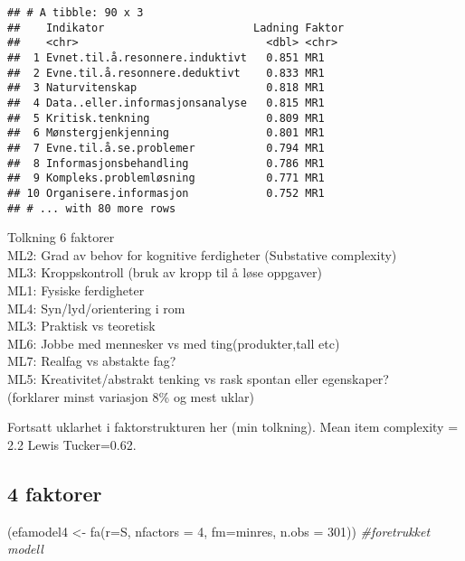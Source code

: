 \documentclass[
]{article}
\newenvironment{Shaded}{\begin{snugshade}}{\end{snugshade}}
\newcommand{\AttributeTok}[1]{\textcolor[rgb]{0.77,0.63,0.00}{#1}}
\newcommand{\CommentTok}[1]{\textcolor[rgb]{0.56,0.35,0.01}{\textit{#1}}}
\newcommand{\DecValTok}[1]{\textcolor[rgb]{0.00,0.00,0.81}{#1}}
\newcommand{\FunctionTok}[1]{\textcolor[rgb]{0.00,0.00,0.00}{#1}}
\newcommand{\NormalTok}[1]{#1}
\newcommand{\OtherTok}[1]{\textcolor[rgb]{0.56,0.35,0.01}{#1}}
\newcommand{\StringTok}[1]{\textcolor[rgb]{0.31,0.60,0.02}{#1}}
\begin{document}
\begin{verbatim}
## # A tibble: 90 x 3
##    Indikator                       Ladning Faktor
##    <chr>                             <dbl> <chr> 
##  1 Evnet.til.å.resonnere.induktivt   0.851 MR1   
##  2 Evne.til.å.resonnere.deduktivt    0.833 MR1   
##  3 Naturvitenskap                    0.818 MR1   
##  4 Data..eller.informasjonsanalyse   0.815 MR1   
##  5 Kritisk.tenkning                  0.809 MR1   
##  6 Mønstergjenkjenning               0.801 MR1   
##  7 Evne.til.å.se.problemer           0.794 MR1   
##  8 Informasjonsbehandling            0.786 MR1   
##  9 Kompleks.problemløsning           0.771 MR1   
## 10 Organisere.informasjon            0.752 MR1   
## # ... with 80 more rows
\end{verbatim}

Tolkning 6 faktorer\\
ML2: Grad av behov for kognitive ferdigheter (Substative complexity)\\
ML3: Kroppskontroll (bruk av kropp til å løse oppgaver)\\
ML1: Fysiske ferdigheter\\
ML4: Syn/lyd/orientering i rom\\
ML3: Praktisk vs teoretisk\\
ML6: Jobbe med mennesker vs med ting(produkter,tall etc)\\
ML7: Realfag vs abstakte fag?\\
ML5: Kreativitet/abstrakt tenking vs rask spontan eller egenskaper?\\
(forklarer minst variasjon 8\% og mest uklar)

Fortsatt uklarhet i faktorstrukturen her (min tolkning). Mean item
complexity = 2.2 Lewis Tucker=0.62.

\hypertarget{faktorer}{%
\subsection{4 faktorer}\label{faktorer}}

\begin{Shaded}
\begin{Highlighting}[]
\NormalTok{(efamodel4 }\OtherTok{\textless{}{-}} \FunctionTok{fa}\NormalTok{(}\AttributeTok{r=}\NormalTok{S, }\AttributeTok{nfactors =} \DecValTok{4}\NormalTok{, }\AttributeTok{fm=}\StringTok{\textquotesingle{}minres\textquotesingle{}}\NormalTok{, }\AttributeTok{n.obs =} \DecValTok{301}\NormalTok{)) }\CommentTok{\#foretrukket modell}
\end{Highlighting}
\end{Shaded}
\end{document}
